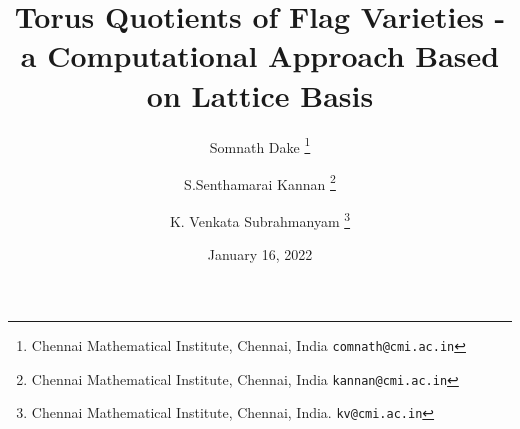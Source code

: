 
\usepackage{tikz-cd}

\author{
Somnath Dake \thanks{Chennai Mathematical Institute, Chennai, India \tt{comnath@cmi.ac.in}}
\and
S.Senthamarai Kannan \thanks{Chennai Mathematical Institute, Chennai, India \tt{kannan@cmi.ac.in}}
\and 
K. Venkata Subrahmanyam \thanks {Chennai Mathematical Institute, Chennai, India. \tt{kv@cmi.ac.in}}
}

\title{Torus Quotients of Flag Varieties - a Computational Approach Based on Lattice Basis} 
\date{January 16, 2022} 

\maketitle
%






%





\appendix




